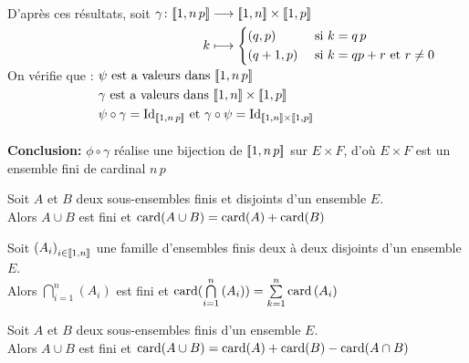 \documentclass[12pt,twoside,a4paper]{article}
\begin{document}
\begin{preuve}
		\\
		D'apr\`es ces r\'esultats, soit $\begin{aligned}[t]\gamma\colon[\![ 1,n\,p]\!]&\longrightarrow[\![ 1,n]\!]\times [\![ 1,p]\!] \\k&\longmapsto\left\{\begin{aligned}
			& (q,p) &\text{ si } & k=q\,p\\
			& (q+1,p)&\text{ si } & k=qp+r\text{ et } r\neq0
			\end{aligned}\right.\end{aligned} $\\
		On v\'erifie que :
		$\begin{aligned}[t]
		& \psi \text{ est a valeurs dans }\lbracket 1,n\,p\rbracket\\
		& \gamma \text{ est a valeurs dans }\lbracket 1,n\rbracket\times \lbracket 1,p\rbracket\\
		& \psi\circ\gamma=\text{Id}_{\lbracket 1,n\,p\rbracket} \et \gamma\circ \psi=\text{Id}_{\lbracket 1,n\rbracket\times\lbracket 1,p\rbracket}
		\end{aligned}$\\
		\\
		\textbf{Conclusion:} $\phi\circ\gamma$ r\'ealise une bijection de $[\![ 1,n\,p]\!]$ sur $E\times F$, d'o\`u $E\times F$ est un ensemble fini de cardinal $n\,p$
	\end{preuve}
	\begin{prop}
		Soit $A$ et $B$ deux sous-ensembles finis et disjoints d'un ensemble $E$.\\
		Alors $A\cup B$ est fini et $\text{card}(A\cup B)=\text{card}(A)+\text{card}(B)$
	\end{prop}
	\begin{coro}
		Soit $\left(A_i\right)_{i\in[\![ 1,n]\!]}$ une famille d'ensembles finis deux \`a deux disjoints d'un ensemble $E$.\\
		Alors $\bigcap\limits^{n}_{i=1}\left(A_i\right)$ est fini et $\text{card}(\bigcap\limits^{n}_{i=1}\left(A_i\right))=\sum\limits^{n}_{k=1}\text{card}\left(A_i\right)$
	\end{coro}
	\begin{coro}
		Soit $A$ et $B$ deux sous-ensembles finis d'un ensemble $E$.\\
		Alors $A\cup B$ est fini et $\text{card}(A\cup B)=\text{card}(A)+\text{card}(B)-\text{card}(A\cap B)$
	\end{coro}
\end{document}
